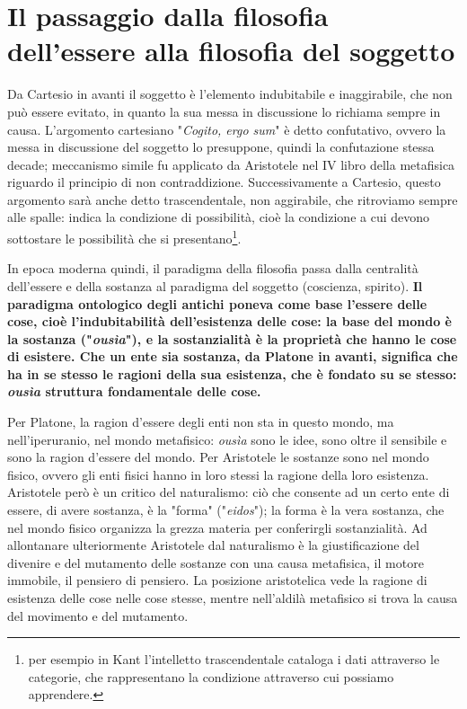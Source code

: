 \chapter{Il passaggio dalla filosofia dell'essere alla filosofia del soggetto}

\bigskip
\bigskip
\bigskip
\bigskip
\bigskip


Da Cartesio in avanti il soggetto è l'elemento indubitabile e inaggirabile, che non può essere evitato, in quanto la sua messa in discussione lo richiama sempre in causa. L'argomento cartesiano "\textit{Cogito, ergo sum}" è detto confutativo, ovvero la messa in discussione del soggetto lo presuppone, quindi la confutazione stessa decade; meccanismo simile fu applicato da Aristotele nel IV libro della metafisica riguardo il principio di non contraddizione. Successivamente a Cartesio, questo argomento sarà anche detto  trascendentale,  non aggirabile, che ritroviamo sempre alle spalle: indica la condizione di possibilità, cioè la condizione a cui devono sottostare le possibilità che si presentano\footnote{per esempio in Kant l’intelletto trascendentale
	cataloga i dati attraverso le categorie, che rappresentano la condizione attraverso cui possiamo apprendere.}.

In epoca moderna quindi, il paradigma della filosofia passa dalla centralità dell'essere e della sostanza al paradigma del soggetto (coscienza, spirito). \textbf{Il paradigma ontologico degli antichi poneva come base l'essere delle cose, cioè l'indubitabilità dell'esistenza delle cose: la base del mondo è la sostanza ("\textit{ousìa}"), e la sostanzialità è la proprietà che hanno le cose di esistere. Che un ente sia sostanza, da Platone in avanti, significa che ha in se stesso le ragioni della sua esistenza, che è fondato su se stesso: \textit{ousìa} struttura fondamentale delle cose.}

Per Platone, la ragion d'essere degli enti non sta in questo mondo, ma nell'iperuranio, nel mondo metafisico: \textit{ousìa} sono le idee, sono oltre il sensibile e sono la ragion d'essere del mondo. Per Aristotele le sostanze sono nel mondo fisico, ovvero gli enti fisici hanno in loro stessi la ragione della loro esistenza. Aristotele però è un critico del naturalismo: ciò che consente ad un certo ente di essere, di avere sostanza, è la "forma" ("\textit{eidos}"); la forma è la vera sostanza, che nel mondo fisico organizza la grezza materia per conferirgli sostanzialità. Ad allontanare ulteriormente Aristotele dal naturalismo è la giustificazione del divenire e del mutamento delle sostanze con una causa metafisica, il motore immobile, il pensiero di pensiero. La posizione aristotelica vede la ragione di esistenza delle cose nelle cose stesse, mentre nell'aldilà metafisico si trova la causa del movimento e del mutamento.

